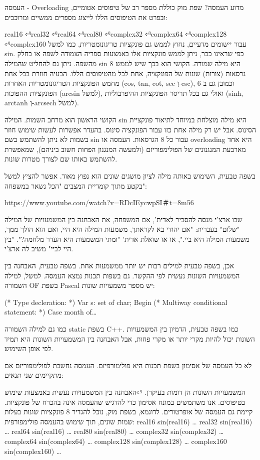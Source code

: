       העמסה - Overloading
      מדוע העמסה?
      שפת מוק כוללת מספר רב של טיפוסים אטומיים, ובפרט את הטיפוסים הללו לייצוג מספרים ממשיים ומרוכבים:
      \begin{ציינון}
\item real16
⏎real32
⏎real64
⏎real80
⏎complex32
⏎complex64
⏎complex128
⏎complex160
      עבור יישומים מדעיים, נחוץ לממש גם פונקציות טריגונומטריות, כמו למשל sin. כפי שראינו כבר, ניתן לממש פונקציות אלו באמצעות ספריה הצמודה לשפה או כחלק מהשפה. ניתן גם להחליט שהמילה sin היא מילה שמורה. הקושי הוא בכך שיש לממש 8 גרסאות (צורות) שונות של הפונקציה, אחת לכל מהטיפוסים הללו. הבעיה חוזרת בכל אחת מחמש הפונקציות הטריגונומטריות האחרות (cos, tan, cot, sec וְ-csc), וכמובן גם ב-6 הפונקציות ההפוכות (arcsin למשל), ואולי גם בכל תריסר הפונקציות ההיפרבוליות (sinh, arctanh וְ-arcsech למשל).
  \end{ציינון}

      הקושי הראשון הוא מרחב השמות. המילה sin היא מילה מוצלחת במיוחד לתיאור פונקציית הסינוס. אבל יש רק מילה אחת כזו עבור הפונקציה סינוס. בהעדר אפשרות לעשות שימוש חוזר בשמות לא ניתן להשתמש בשם sin עבור כל 8 הגרסאות. העמסה או overloading היא אחד מארבעת המנגנונים של הפולימפוריזם (ולמעשה המנגנון הפחות חשוב ביניהם), שמאפשרת להשתמש באותו שם לצורך מטרות שונות.

      בשפה טבעית, השימוש באותה מילה לציון מושגים שונים הוא נפוץ מאוד. אפשר להציץ למשל בקטע מתוך קומדיית המצבים "הכל נשאר במשפחה":

      https://www.youtube.com/watch?v=RDcIEycwpSI＃t=8m56

      שבו ארצ'י מנסה להסביר לאדית', אם המשפחה, את האבחנה בין המשמעויות של המילה "שלום" בעברית: "אם יהודי בא לקראתך, משמעות המילה היא היי, ואם הוא הולך ממך, משמעות המילה היא ביי.", או אז שואלת אדית' "ומתי המשמעות היא העדר מלחמה?". "בין היי לביי" משיב לה ארצ'י.

      אכן, בשפה טבעית למילים רבות יש יותר ממשמעות אחת. בשפה טבעית, האבחנה בין המשמעויות השונות נעשית לפי ההקשר. גם בשפות תכנות נמצא העמסה. למשל, למילה השמורה OF בשפת Pascal יש מספר משמעויות שונות:

      (* Type decleration: *)
      Var s: set of char;
      Begin
      (* Multiway conditional statement: *)
      Case month of…

      כמו גם למילה השמורה static בשפת C++. כמו בשפה טבעית, הדמיון בין המשמעויות השונות יכול להיות מקרי יותר או מקרי פחות, אבל האבחנה בין המשמעויות השונות היא תמיד לפי אופן השימוש.

      לא כל העמסה של אסימון בשפת תכנות היא פולימורפיזם. העמסה נחשבת לפולימפוריזם אם מתקיימים שני תנאים:
      \begin{ציינון}
\item המשמעויות השונות הן דומות בעיקרן.
⏎האבחנה בין המשמעויות נעשית באמצעות שימוש בטיפוסים.
      אנו משתמשים במונח אסימון כדי להדגיש שהעמסה אינה בהכרח של פונקציות. קיימת גם העמסה של אופרטורים.
      לדוגמא, בשפת מוק, נוכל להגדיר 8 פונקציות שונות בעלות שמות שונים, תוך שימוש בהעמסה פולימפורפית:
      real16 sin(real16) {…}
      real32 sin(real16) {…}
      real64 sin(real16) {…}
      real80 sin(real80) {…}
      complex32 sin(complex32) {…}
      complex64 sin(complex64) {…}
      complex128 sin(complex128) {…}
      complex160 sin(complex160) {…}
  \end{ציינון}

